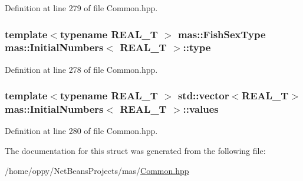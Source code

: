 Definition at line 279 of file Common.\-hpp.

\hypertarget{structmas_1_1_initial_numbers_a6b46cfc99c64ffdb76769cc8bc363d3c}{
\subsubsection[{type}]{\setlength{\rightskip}{0pt plus 5cm}template$<$typename R\-E\-A\-L\-\_\-\-T $>$ {\bf mas\-::\-Fish\-Sex\-Type} {\bf mas\-::\-Initial\-Numbers}$<$ R\-E\-A\-L\-\_\-\-T $>$\-::type}}\label{structmas_1_1_initial_numbers_a6b46cfc99c64ffdb76769cc8bc363d3c}


Definition at line 278 of file Common.\-hpp.

\hypertarget{structmas_1_1_initial_numbers_ab6070a2ddfcbcbbce11349c5d0aa05f2}{
\subsubsection[{values}]{\setlength{\rightskip}{0pt plus 5cm}template$<$typename R\-E\-A\-L\-\_\-\-T $>$ std\-::vector$<$R\-E\-A\-L\-\_\-\-T$>$ {\bf mas\-::\-Initial\-Numbers}$<$ R\-E\-A\-L\-\_\-\-T $>$\-::values}}\label{structmas_1_1_initial_numbers_ab6070a2ddfcbcbbce11349c5d0aa05f2}


Definition at line 280 of file Common.\-hpp.



The documentation for this struct was generated from the following file\-:\begin{DoxyCompactItemize}
\item 
/home/oppy/\-Net\-Beans\-Projects/mas/\hyperlink{_common_8hpp}{Common.\-hpp}\end{DoxyCompactItemize}
